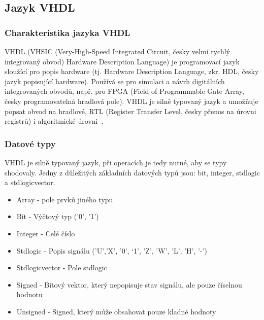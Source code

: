 \documentclass{report}
\begin{document}
\subsection{Jazyk VHDL}\label{sec:jazykvhdl}
\subsubsection{Charakteristika jazyka VHDL}
VHDL (VHSIC (Very-High-Speed Integrated Circuit, česky velmi rychlý integrovaný obvod) Hardware Description Language) je programovací jazyk sloužící pro popis hardware (tj. Hardware Description Language, zkr. HDL, česky jazyk popisující hardware). Používá se pro simulaci a návrh digitálních integrovaných obvodů, např. pro FPGA (Field of Programmable Gate Array, česky programovatelná hradlová pole). VHDL je silně typovaný jazyk a umožňuje popsat obvod na hradlové, RTL (Register Transfer Level, česky přenos na úrovni registrů) i algoritmické úrovni~\cite{vhdlI}.
\subsubsection{Datové typy}
VHDL je silně typovaný jazyk, při operacích je tedy nutné, aby se typy shodovaly. Jedny z důležitých základních datových typů jsou: bit, integer, std\textunderscore logic a std\textunderscore logic\textunderscore vector. 
\begin{itemize}
  \item Array - pole prvků jiného typu
  \item Bit - Výčtový typ ('0', '1')
  \item Integer - Celé číslo
  \item Std\textunderscore logic - Popis signálu ('U’,'X', '0',  ‘1', 'Z', 'W',  'L', 'H', '-')
  \item Std\textunderscore logic\textunderscore vector - Pole std\textunderscore logic
  \item Signed - Bitový vektor, který nepopisuje stav signálu, ale pouze číselnou hodnotu
  \item Unsigned - Signed, který může obsahovat pouze kladné hodnoty
\end{itemize}
\end{document}
